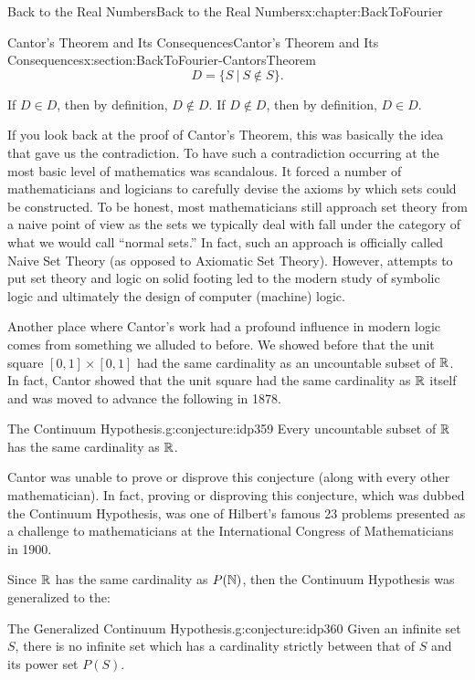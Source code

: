 \begin{chapterptx}{Back to the Real Numbers}{}{Back to the Real Numbers}{}{}{x:chapter:BackToFourier}
\begin{sectionptx}{Cantor's Theorem and Its Consequences}{}{Cantor's Theorem and Its Consequences}{}{}{x:section:BackToFourier-CantorsTheorem}
		\begin{equation*}
			D=\{S\ |\ S\not \in S\}\text{.}
		\end{equation*}
		\par
		If \(D\in D\), then by definition, \(D\not\in D\). If \(D\not\in D\), then by definition, \(D\in D\).%
		\par
		If you look back at the proof of Cantor's Theorem, this was basically the idea that gave us the contradiction.  To have such a contradiction occurring at the most basic level of mathematics was scandalous.  It forced a number of mathematicians and logicians to carefully devise the axioms by which sets could be constructed. To be honest, most mathematicians still approach set theory from a naive point of view as the sets we typically deal with fall under the category of what we would call ``normal sets.'' In fact, such an approach is officially called Naive Set Theory (as opposed to Axiomatic Set Theory).  However, attempts to put set theory and logic on solid footing led to the modern study of symbolic logic and ultimately the design of computer (machine) logic.%
		\par
		Another place where Cantor's work had a profound influence in modern logic comes from something we alluded to before.  We showed before that the unit square \([0,1]\times [0,1]\) had the same cardinality as an uncountable subset of \(\mathbb {R}\).  In fact, Cantor  showed that the unit square had the same cardinality as \(\mathbb {R}\) itself and was moved to advance the following in 1878.%
		\begin{conjecture}{The Continuum Hypothesis.}{}{g:conjecture:idp359}%
			Every uncountable subset of \(\mathbb {R}\) has the same cardinality as \(\mathbb {R}\).%
		\end{conjecture}
		Cantor was unable to prove or disprove this conjecture (along with every other mathematician). In fact, proving or disproving this conjecture, which was dubbed the Continuum Hypothesis, was one of Hilbert's famous 23 problems presented as a challenge to mathematicians at the International Congress of Mathematicians in 1900.%
		\par
		Since \(\mathbb {R}\) has the same cardinality as \(P(\mathbb {N})\), then the Continuum Hypothesis was generalized to the:%
		\begin{conjecture}{The Generalized Continuum Hypothesis.}{}{g:conjecture:idp360}%
			Given an infinite set \(S\), there is no infinite set which has a cardinality strictly between that of \(S\) and its power set \(P(S)\).%

\end{conjecture}
\end{sectionptx}
\end{chapterptx}
